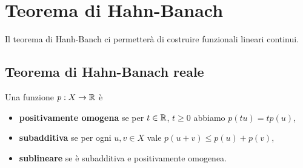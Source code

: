 \chapter{Teorema di Hahn-Banach}

Il teorema di Hanh-Banch ci permetter\`a di costruire funzionali lineari continui.


\section{Teorema di Hahn-Banach reale}
\begin{definition}
Una funzione $p:X\to \mathbb{R}$ \`e 
\begin{itemize}
    \item \textbf{positivamente omogena} se per $t\in\mathbb{R}$, $t\geq 0$ abbiamo $p(tu)=tp(u)$,
    \item \textbf{subadditiva} se per ogni $u,v\in X$ vale $p(u+v)\leq p(u)+p(v)$,
    \item \textbf{sublineare} se \`e subadditiva e positivamente omogenea.
\end{itemize}
\end{definition}



